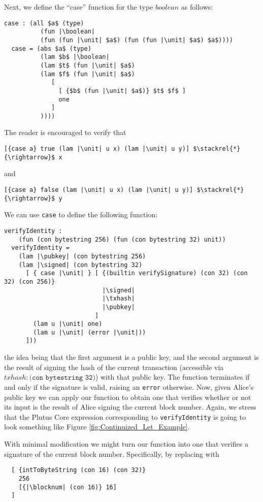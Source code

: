 \documentclass[../plutus-core-specification.tex]{subfiles}
\begin{document}
\noindent Next, we define the ``case'' function for the type $boolean$ as follows:
\begin{lstlisting}[basicstyle=\ttfamily,mathescape]
  case : (all $a$ (type)
          (fun |\boolean|
          (fun (fun |\unit| $a$) (fun (fun |\unit| $a$) $a$))))
  case = (abs $a$ (type)
          (lam $b$ |\boolean|
          (lam $t$ (fun |\unit| $a$)
          (lam $f$ (fun |\unit| $a$)
             [
               [ {$b$ (fun |\unit| $a$)} $t$ $f$ ]
               one
             ]
          ))))
\end{lstlisting}
The reader is encouraged to verify that
\begin{lstlisting}[basicstyle=\ttfamily,mathescape]
  [{case a} true (lam |\unit| u x) (lam |\unit| u y)] $\stackrel{*}{\rightarrow}$ x
\end{lstlisting}
and
\begin{lstlisting}[basicstyle=\ttfamily,mathescape]
  [{case a} false (lam |\unit| u x) (lam |\unit| u y)] $\stackrel{*}{\rightarrow}$ y
\end{lstlisting}

\noindent We can use \texttt{case} to define the following function:
\begin{lstlisting}[basicstyle=\ttfamily,mathescape]
  verifyIdentity :
    (fun (con bytestring 256) (fun (con bytestring 32) unit))
  verifyIdentity =
    (lam |\pubkey| (con bytestring 256)
    (lam |\signed| (con bytestring 32)
      [ { case |\unit| } [ {(builtin verifySignature) (con 32) (con 32) (con 256)}
                           |\signed|
                           |\txhash|
                           |\pubkey|
                         ]
        (lam u |\unit| one)
        (lam u |\unit| (error |\unit|))
      ]))
\end{lstlisting}
the idea being that the first argument is a public key, and the second
argument is the result of signing the hash of the current transaction
(accessible via $\mathit{txhash} : \texttt{(con bytestring 32)}$) with
that public key. The function terminates if and only if the signature
is valid, raising an \texttt{error} otherwise. Now, given Alice's
public key we can apply our function to obtain one that verifies
whether or not its input is the result of Alice signing the current
block number. Again, we stress that the Plutus Core expression
corresponding to \texttt{verifyIdentity} is going to look something
like Figure \ref{fig:Continuized_Let_Example}.

With minimal modification we might turn our function into one that
verifies a signature of the current block number. Specifically, by
replacing \txhash{} with
\begin{lstlisting}
  [ {intToByteString (con 16) (con 32)}
    256
    [{|\blocknum| (con 16)} 16]
  ]
\end{lstlisting}
\end{document}
